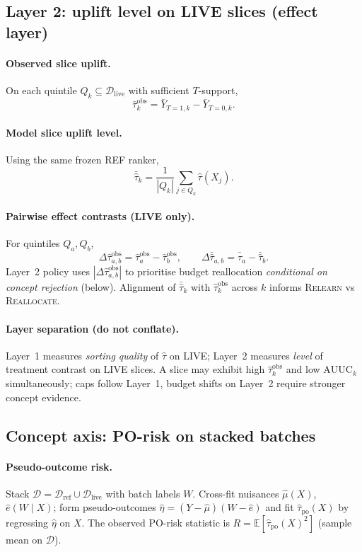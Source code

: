 \subsection{Layer 2: uplift level on LIVE slices (effect layer)}

\paragraph{Observed slice uplift.}
On each quintile $Q_k\subseteq\mathcal{D}_{\mathrm{live}}$ with sufficient $T$-support,
\[
  \widehat{\tau}^{\mathrm{obs}}_k
  = \bar Y_{T=1,k}-\bar Y_{T=0,k}.
\]

\paragraph{Model slice uplift level.}
Using the same frozen REF ranker,
\[
  \bar{\hat\tau}_k = \frac{1}{|Q_k|}\sum_{j\in Q_k} \hat\tau(X_j).
\]

\paragraph{Pairwise effect contrasts (LIVE only).}
For quintiles $Q_a,Q_b$,
\[
  \Delta\widehat{\tau}^{\mathrm{obs}}_{a,b}
  = \widehat{\tau}^{\mathrm{obs}}_a - \widehat{\tau}^{\mathrm{obs}}_b,
  \qquad
  \Delta\bar{\hat\tau}_{a,b} = \bar{\hat\tau}_a - \bar{\hat\tau}_b.
\]
Layer~2 policy uses $|\Delta\widehat{\tau}^{\mathrm{obs}}_{a,b}|$ to prioritise budget reallocation \emph{conditional on concept rejection} (below).
Alignment of $\bar{\hat\tau}_k$ with $\widehat{\tau}^{\mathrm{obs}}_k$ across $k$ informs \textsc{Relearn} vs \textsc{Reallocate}.

\paragraph{Layer separation (do not conflate).}
Layer~1 measures \emph{sorting quality} of $\hat\tau$ on LIVE; Layer~2 measures \emph{level} of treatment contrast on LIVE slices.
A slice may exhibit high $\widehat{\tau}^{\mathrm{obs}}_k$ and low $\mathrm{AUUC}_k$ simultaneously; caps follow Layer~1, budget shifts on Layer~2 require stronger concept evidence.

\subsection{Concept axis: PO-risk on stacked batches}

\paragraph{Pseudo-outcome risk.}
Stack $\mathcal{D}=\mathcal{D}_{\mathrm{ref}}\cup\mathcal{D}_{\mathrm{live}}$ with batch labels $W$.
Cross-fit nuisances $\hat\mu(X)$, $\hat e(W\mid X)$; form pseudo-outcomes $\hat\eta=(Y-\hat\mu)(W-\hat e)$ and fit $\hat\tau_{\mathrm{po}}(X)$ by regressing $\hat\eta$ on $X$.
The observed PO-risk statistic is $R=\mathbb E[\hat\tau_{\mathrm{po}}(X)^2]$ (sample mean on $\mathcal{D}$).

